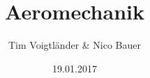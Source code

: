 \documentclass[a4paper,12pt]{scrartcl}
\begin{document}
\author{Tim Voigtländer \& Nico Bauer}
\title{Aeromechanik}
\date{19.01.2017} 

\maketitle
\tableofcontents
{}

\newpage


\begin{thebibliography}{999}
\end{thebibliography}
\end{document}
